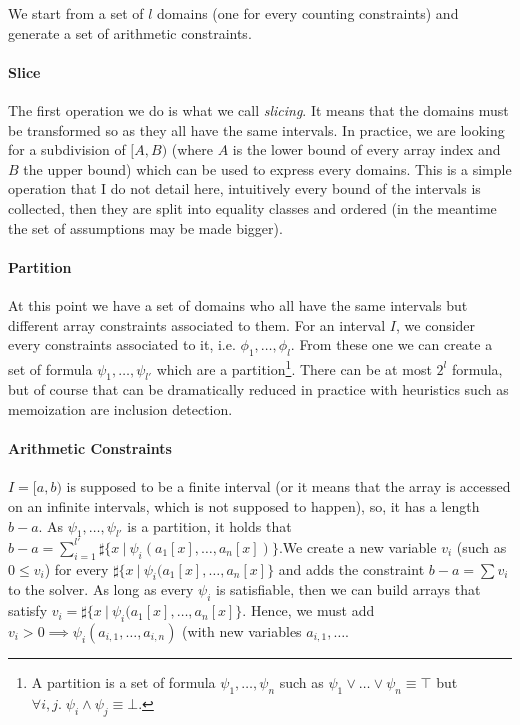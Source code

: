 \documentclass[]{article}
\begin{document}
{{We start from a set of $l$ domains (one for every counting
constraints) and generate a set of arithmetic constraints.

\paragraph{Slice}\label{slice}

The first operation we do is what we call \emph{slicing}. It means that
the domains must be transformed so as they all have the same intervals.
In practice, we are looking for a subdivision of $[A, B)$ (where $A$
is the lower bound of every array index and $B$ the upper bound) which
can be used to express every domains. This is a simple operation that I
do not detail here, intuitively every bound of the intervals is
collected, then they are split into equality classes and ordered (in the
meantime the set of assumptions may be made bigger).

\paragraph{Partition}\label{partition}

At this point we have a set of domains who all have the same intervals
but different array constraints associated to them. For an interval
$I$, we consider every constraints associated to it, i.e.
$\phi_1, \ldots, \phi_l$. From these one we can create a set of formula
$\psi_1, \ldots, \psi_{l'}$ which are a
partition\footnote{A partition is a set of formula $\psi_1, \ldots, \psi_n$ such as $\psi_1 \lor \ldots \lor \psi_n \equiv \top$ but $\forall i, j. \; \psi_i \land \psi_j \equiv \bot$.}.
There can be at most $2^l$ formula, but of course that can be
dramatically reduced in practice with heuristics such as memoization are
inclusion detection.

\paragraph{Arithmetic Constraints}\label{arithmetic-constraints}

$I = [a, b)$ is supposed to be a finite interval (or it means that the
array is accessed on an infinite intervals, which is not supposed to
happen), so, it has a length $b - a$. As $\psi_1, \ldots, \psi_{l'}$ is a
partition, it holds that
$b - a = \sum\limits_{i = 1}^{l'} \sharp\{x \ |\ \psi_i(a_1[x], \ldots, a_n[x])\}$.We
create a new variable $v_i$ (such as $0 \le v_i$) for every
$\sharp\{x\ |\ \psi_i(a_1[x], \ldots, a_n[x]\}$ and adds the constraint
$b - a = \sum v_i$ to the solver. As long as every $\psi_i$ is
satisfiable, then we can build arrays that satisfy
$v_i = \sharp\{x\ |\ \psi_i(a_1[x], \ldots, a_n[x]\}$. Hence, we must add
$v_i > 0 \implies \psi_i(a_{i, 1}, \ldots, a_{i, n})$ (with new variables
$a_{i, 1}, \ldots$.

}}
\end{document}
